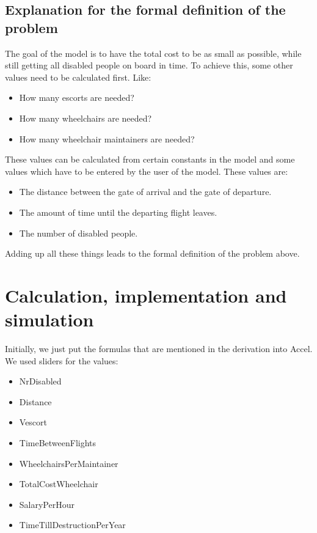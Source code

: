 \documentclass[a4paper, 11pt, notitlepage]{report}
\begin{document}
	\section{Explanation for the formal definition of the problem}
	The goal of the model is to have the total cost to be as small as possible, while still getting all disabled people on board in time. To achieve this, some other values need to be calculated first. Like:
\begin{itemize}
\itemsep0em
  \item How many escorts are needed?
  \item How many wheelchairs are needed?
  \item How many wheelchair maintainers are needed?
\end{itemize}
These values can be calculated from certain constants in the model and some values which have to be entered by the user of the model. These values are:
\begin{itemize}
\itemsep0em
  \item The distance between the gate of arrival and the gate of departure.
  \item The amount of time until the departing flight leaves.
  \item The number of disabled people.
\end{itemize}
Adding up all these things leads to the formal definition of the problem above.


\chapter{Calculation, implementation and simulation}
Initially, we just put the formulas that are mentioned in the derivation into Accel. We used sliders for the values:
    \begin{itemize}
    \itemsep0em
    \item\vspace{-8pt} NrDisabled
    \item Distance
    \item Vescort
    \item TimeBetweenFlights
    \item WheelchairsPerMaintainer
    \item TotalCostWheelchair
    \item SalaryPerHour
    \item TimeTillDestructionPerYear
    \end{itemize}
\end{document}
